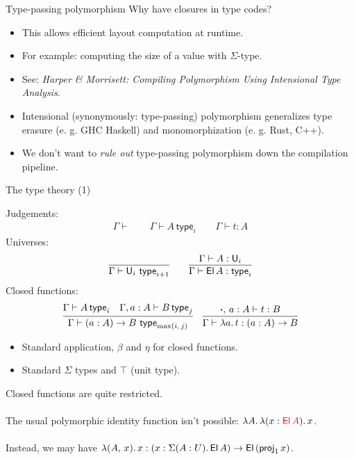 \documentclass{beamer}
\newcommand{\type}{\mathsf{type}}
\begin{document}
\begin{frame}{Type-passing polymorphism}
Why have closures in type codes?

  \begin{itemize}
  \item
  This allows efficient layout computation at runtime.
  \item
  For example: computing the size of a value with $\Sigma$-type.
  \item
  See: \emph{Harper \& Morrisett: Compiling Polymorphism Using Intensional Type Analysis}.
  \item
    Intensional (synonymously: type-passing) polymorphism generalizes type erasure (e. g. GHC Haskell) and monomorphization (e. g. Rust, C++).
  \item
  We don't want to \emph{rule out} type-passing polymorphism down the compilation pipeline.
  \end{itemize}

\end{frame}

\begin{frame}{The type theory (1)}

Judgements:
\begin{gather*}
  \Gamma \vdash  \hspace{2em}  \Gamma \vdash A\,\type_i \hspace{2em} \Gamma \vdash t : A
\end{gather*}
Universes:
\begin{gather*}
  \infer{\Gamma \vdash \U_i\,\,\type_{i+1}}{}
  \hspace{2em}
  \infer{\Gamma \vdash \El\,A : \type_i}{\Gamma \vdash A : \U_i}
\end{gather*}
Closed functions:
\begin{gather*}
  \infer{\Gamma \vdash (a : A)\ra B\,\,\type_{\max(i,\,j)}}{\Gamma \vdash A\,\type_i & \Gamma, a : A \vdash B\,\type_j}
  \hspace{1em}
  \infer{\Gamma \vdash \lambda a.\,t : (a : A)\ra B}{\boldsymbol{\cdot},\,a : A \vdash t : B}
\end{gather*}
\begin{itemize}
\item Standard application, $\beta$ and $\eta$ for closed functions.
\item Standard $\Sigma$ types and $\top$ (unit type).
\end{itemize}
\end{frame}

\begin{frame}{}

  Closed functions are quite restricted.\\~\\
  The usual polymorphic identity function isn't possible: $\lambda A.\,\lambda (x : {\color{red}\mathsf{El}\,A}).\, x$.\\~\\
  Instead, we may have $\lambda(A,\,x).\,x : (x : \Sigma(A : U).\,\mathsf{El}\,A) \rightarrow \mathsf{El}\,(\mathsf{proj}_1\,x)$.

\end{frame}
\end{document}
